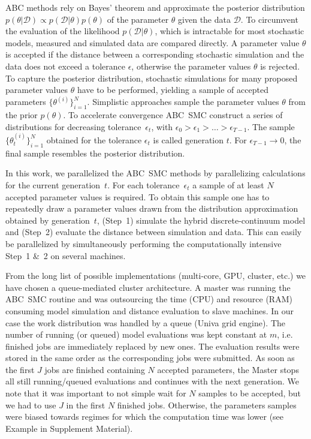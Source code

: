\documentclass[10pt,letterpaper]{article}
\newcommand{\nj}[1]{{\color{blue}#1}}
\begin{document}
ABC methods rely on Bayes' theorem and approximate the posterior distribution $p(\theta|\mathcal{D}) \propto p(\mathcal{D}|\theta) p(\theta)$ of the parameter $\theta$ given the data $\mathcal{D}$. To circumvent the evaluation of the likelihood $p(\mathcal{D}|\theta)$, which is intractable for most stochastic models, measured and simulated data are compared directly. A parameter value $\theta$ is accepted if the distance between a corresponding stochastic simulation and the data does not exceed a tolerance $\epsilon$, otherwise the parameter values $\theta$ is rejected. To capture the posterior distribution, stochastic simulations for many proposed parameter values $\theta$ have to be performed, yielding a sample of accepted parameters $\{\theta^{(i)}\}_{i=1}^N$. Simplistic approaches sample the parameter values $\theta$ from the prior $p(\theta)$. To accelerate convergence ABC~SMC construct a series of distributions for decreasing tolerance~$\epsilon_t$, with $\epsilon_0 > \epsilon_1 > \ldots > \epsilon_{T-1}$. The sample $\{\theta_t^{(i)}\}_{i=1}^N$ obtained for the tolerance $\epsilon_t$ is called generation $t$. For $\epsilon_{T-1} \rightarrow 0$, the final sample resembles the posterior distribution.

In this work, we parallelized the ABC~SMC methods by parallelizing calculations for the current generation~$t$. For each tolerance~$\epsilon_t$ a sample of at least $N$ accepted parameter values is required. To obtain this sample one has to repeatedly draw a parameter values drawn from the distribution approximation obtained by generation~$t$, (Step~1) simulate the hybrid discrete-continuum model and (Step~2) evaluate the distance between simulation and data. This can easily be parallelized by simultaneously performing the computationally intensive Step~1 \&~2 on several machines.

From the long list of possible implementations (multi-core, GPU, cluster, etc.) we have chosen a queue-mediated cluster architecture. A master was running the ABC~SMC routine and was outsourcing the time (CPU) and resource (RAM) consuming model simulation and distance evaluation to slave machines. In our case the work distribution was handled by a queue (Univa grid engine). The number of running (or queued) model evaluations was kept constant at $m$, i.e. finished jobs are immediately replaced by new ones. The evaluation results were stored in the same order as the corresponding jobs were submitted. As soon as the first $J$ jobs are finished containing $N$ accepted parameters, the Master stops all still running/queued evaluations and continues with the next generation. We note that it was important to not simple wait for $N$ samples to be accepted, but we had to use $J$ in the first $N$ finished jobs. Otherwise, the parameters samples were biased towards regimes for which the computation time was lower \nj{(see Example in Supplement Material)}.
\end{document}
